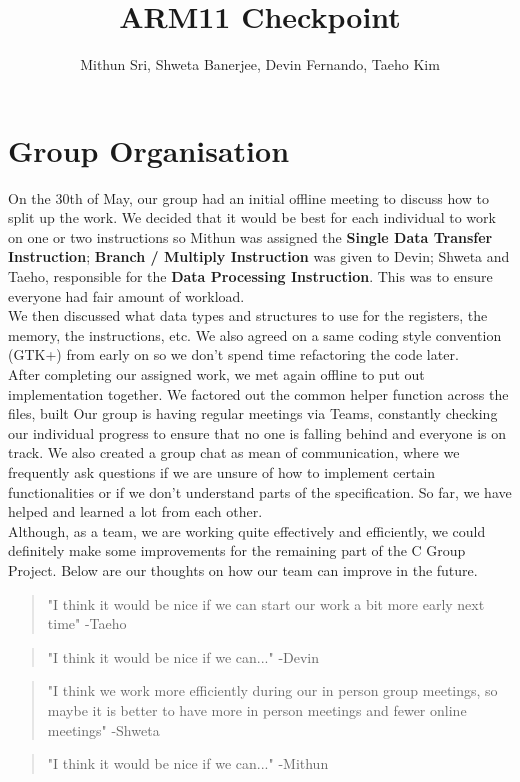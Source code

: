 \documentclass[11pt]{article}
\begin{document}
\title{ARM11 Checkpoint}
\author{Mithun Sri, Shweta Banerjee, Devin Fernando, Taeho Kim}

\maketitle

\section{Group Organisation}


\-\hspace{1cm}On the 30th of May, our group had an initial offline meeting to discuss how to split up the work. We decided that it would be best for each individual to work on one or two instructions so Mithun was assigned the {\bf Single Data Transfer Instruction}; {\bf Branch / Multiply Instruction} was given to Devin; Shweta and Taeho, responsible for the {\bf Data Processing Instruction}. This was to ensure everyone had fair amount of workload. \\
\-\hspace{1cm}We then discussed what data types and structures to use for the registers, the memory, the instructions, etc. We also agreed on a same coding style convention (GTK+) from early on so we don't spend time refactoring the code later. \\
\-\hspace{1cm}After completing our assigned work, we met again offline to put out implementation together. We factored out the common helper function across the files, built 
\-\hspace{1cm}Our group is having regular meetings via Teams, constantly checking our individual progress to ensure that no one is falling behind and everyone is on track. We also created a group chat as mean of communication, where we frequently ask questions if we are unsure of how to implement certain functionalities or if we don't understand parts of the specification. So far, we have helped and learned a lot from each other.\\ 
\-\hspace{1cm}Although, as a team, we are working quite effectively and efficiently, we could definitely make some improvements for the remaining part of the C Group Project. Below are our thoughts on how our team can improve in the future.

\begin{quote}
  "I think it would be nice if we can start our work a bit more early next time" -Taeho
\end{quote}
\begin{quote}
  "I think it would be nice if we can..." -Devin
\end{quote}
\begin{quote}
  "I think we work more efficiently during our in person group meetings, so maybe it is better to have more in person meetings and fewer online meetings" -Shweta
\end{quote}
\begin{quote}
  "I think it would be nice if we can..." -Mithun
\end{quote}
\end{document}
